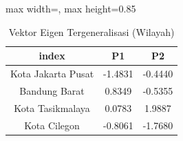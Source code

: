 \begin{table}[H]
\centering
\caption{Vektor Eigen Tergeneralisasi (Wilayah)} \label{tab:samplev_w}
\begin{adjustbox}{max width=\textwidth, max height=0.85\textheight}
\begin{tabular}{|c|c|c|}
\hline
\textbf{index} & \textbf{P1} & \textbf{P2} \\
\hline
Kota Jakarta Pusat & -1.4831 & -0.4440 \\
Bandung Barat & 0.8349 & -0.5355 \\
Kota Tasikmalaya & 0.0783 & 1.9887 \\
Kota Cilegon & -0.8061 & -1.7680 \\
\hline
\end{tabular}
\end{adjustbox}
\end{table}